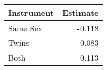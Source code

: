 
\begin{tabular}{lr}
\toprule
Instrument & Estimate\\
\midrule
Same Sex & -0.118\\
Twins & -0.083\\
Both & -0.113\\
\bottomrule
\end{tabular}
